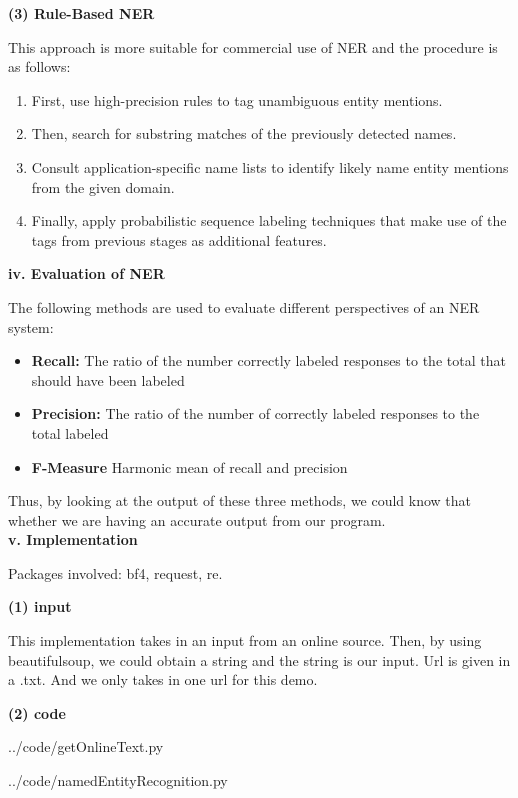 \documentclass[a4paper,12pt]{report}
\begin{document}
\noindent 
\textbf{(3) Rule-Based NER}

\noindent 
This approach is more suitable for commercial use of NER and the procedure is as follows: 
\begin{enumerate}
\item First, use high-precision rules to tag unambiguous entity mentions.
\item Then, search for substring matches of the previously detected names.
\item Consult application-specific name lists to identify likely name entity mentions
from the given domain.
\item Finally, apply probabilistic sequence labeling techniques that make use of the
tags from previous stages as additional features.\\
\end{enumerate}

\noindent 
\textbf{iv. Evaluation of NER}

\noindent
The following methods are used to evaluate different perspectives of an NER system:
\begin{itemize}
\item \textbf{Recall: } The ratio of the number correctly labeled responses to the total that should have been labeled
\item \textbf{Precision: }The ratio of the number of correctly labeled responses to the total labeled
\item \textbf{F-Measure} Harmonic mean of recall and precision
\end{itemize}

\noindent
Thus, by looking at the output of these three methods, we could know that whether we are having an accurate output from our program. \\

\noindent
\textbf{v. Implementation}

\noindent
Packages involved: bf4, request, re.

\noindent
\textbf{(1) input}

\noindent
This implementation takes in an input from an online source. Then, by using beautifulsoup, we could obtain a string and the string is our input. Url is given in a .txt. And we only takes in one url for this demo. 

\noindent
\textbf{(2) code}

\noindent
../code/getOnlineText.py

\noindent
../code/namedEntityRecognition.py
\end{document}
